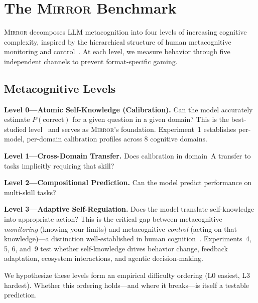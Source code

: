 \documentclass[10pt]{article}
\newcommand{\mirror}{\textsc{Mirror}}
\begin{document}
\section{The \mirror{} Benchmark}
\label{sec:benchmark}

\mirror{} decomposes LLM metacognition into four levels of increasing cognitive
complexity, inspired by the hierarchical structure of human metacognitive monitoring
and control~\citep{flavell1979metacognition, nelson1990metamemory}. At each level,
we measure behavior through five independent channels to prevent format-specific
gaming.

\subsection{Metacognitive Levels}

\textbf{Level 0---Atomic Self-Knowledge (Calibration).}
Can the model accurately estimate $P(\text{correct})$ for a given question in a
given domain? This is the best-studied level~\citep{kadavath2022language,
kapoor2024calibration} and serves as \mirror{}'s foundation. Experiment~1
establishes per-model, per-domain calibration profiles across 8 cognitive domains.

\textbf{Level 1---Cross-Domain Transfer.}
Does calibration in domain~A transfer to tasks implicitly requiring that skill?

\textbf{Level 2---Compositional Prediction.}
Can the model predict performance on multi-skill tasks?

\textbf{Level 3---Adaptive Self-Regulation.}
Does the model translate self-knowledge into appropriate action? This is the
critical gap between metacognitive \textit{monitoring} (knowing your limits) and
metacognitive \textit{control} (acting on that knowledge)---a distinction
well-established in human cognition~\citep{metcalfe2008metacognitive}.
Experiments~4, 5, 6, and~9 test whether self-knowledge drives behavior change,
feedback adaptation, ecosystem interactions, and agentic decision-making.

We hypothesize these levels form an empirical difficulty ordering (L0 easiest, L3
hardest). Whether this ordering holds---and where it breaks---is itself a testable
prediction.
\end{document}
